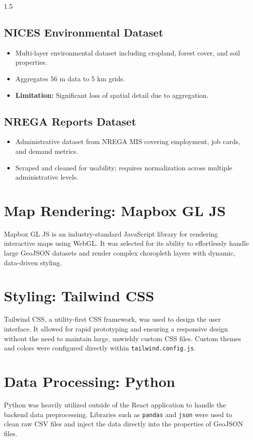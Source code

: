 \documentclass[12pt,a4paper]{report}
\begin{document}
\begin{spacing}{1.5}
\subsection{NICES Environmental Dataset}
\begin{itemize}
    \item Multi-layer environmental dataset including cropland, forest cover, and soil properties.
    \item Aggregates 56 m data to 5 km grids.
    \item \textbf{Limitation:} Significant loss of spatial detail due to aggregation.
\end{itemize}

\subsection{NREGA Reports Dataset}
\begin{itemize}
    \item Administrative dataset from NREGA MIS covering employment, job cards, and demand metrics.
    \item Scraped and cleaned for usability; requires normalization across multiple administrative levels.
\end{itemize}

\section{Map Rendering: Mapbox GL JS}
Mapbox GL JS is an industry-standard JavaScript library for rendering interactive maps using WebGL. It was selected for its ability to effortlessly handle large GeoJSON datasets and render complex choropleth layers with dynamic, data-driven styling.

\section{Styling: Tailwind CSS}
Tailwind CSS, a utility-first CSS framework, was used to design the user interface. It allowed for rapid prototyping and ensuring a responsive design without the need to maintain large, unwieldy custom CSS files. Custom themes and colors were configured directly within \texttt{tailwind.config.js}.

\section{Data Processing: Python}
Python was heavily utilized outside of the React application to handle the backend data preprocessing. Libraries such as \texttt{pandas} and \texttt{json} were used to clean raw CSV files and inject the data directly into the properties of GeoJSON files.


\end{spacing}
\end{document}
